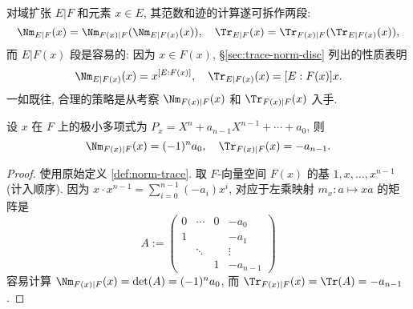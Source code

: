 对域扩张 $E|F$ 和元素 $x \in E$, 其范数和迹的计算遂可拆作两段:
\[ \Nm_{E|F}(x) = \Nm_{F(x)|F}(\Nm_{E|F(x)}(x)), \quad \Tr_{E|F}(x)=\Tr_{F(x)|F}(\Tr_{E|F(x)}(x)), \]
而 $E|F(x)$ 段是容易的: 因为 $x \in F(x)$, \S\ref{sec:trace-norm-disc} 列出的性质表明
\begin{gather}\label{eqn:norm-trace-field-prepa}
	\Nm_{E|F(x)}(x) = x^{[E:F(x)]}, \quad \Tr_{E|F(x)}(x) = [E:F(x)] x.
\end{gather}
一如既往, 合理的策略是从考察 $\Nm_{F(x)|F}(x)$ 和 $\Tr_{F(x)|F}(x)$ 入手.

\begin{theorem}\label{prop:norm-trace-F(x)}
	设 $x$ 在 $F$ 上的极小多项式为 $P_x = X^n + a_{n-1}X^{n-1} + \cdots + a_0$, 则
	\[ \Nm_{F(x)|F}(x) = (-1)^n a_0, \quad \Tr_{F(x)|F}(x) = -a_{n-1}. \]
\end{theorem}
\begin{proof}
	使用原始定义 \ref{def:norm-trace}. 取 $F$-向量空间 $F(x)$ 的基 $1, x, \ldots, x^{n-1}$ (计入顺序). 因为 $x \cdot x^{n-1} = \sum_{i=0}^{n-1} (-a_i)x^i$, 对应于左乘映射 $m_x: a \mapsto xa$ 的矩阵是
	\[ A := \begin{pmatrix}
		0 & \cdots & 0 & -a_0 \\
		1 & & & -a_1 \\
		& \ddots & & \vdots \\
		& & 1 & -a_{n-1}
	\end{pmatrix}\]
	容易计算 $\Nm_{F(x)|F}(x) = \det(A) = (-1)^n a_0$, 而 $\Tr_{F(x)|F}(x) = \Tr(A) = -a_{n-1}$.
\end{proof}

